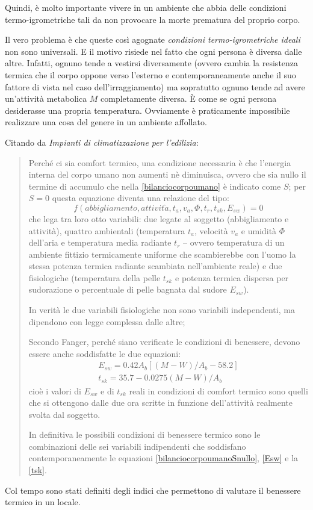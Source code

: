 Quindi, è molto importante vivere in un ambiente che abbia delle condizioni termo-igrometriche tali da non provocare la morte prematura del proprio corpo.

Il vero problema è che queste così agognate \emph{condizioni termo-igrometriche ideali} non sono universali. E il motivo risiede nel fatto che ogni persona è diversa dalle altre. Infatti, ognuno tende a vestirsi diversamente (ovvero cambia la resistenza termica che il corpo oppone verso l'esterno e contemporaneamente anche il suo fattore di vista nel caso dell'irraggiamento) ma sopratutto ognuno tende ad avere un'attività metabolica $M$ completamente diversa. È come se ogni persona desiderasse una propria temperatura. Ovviamente è praticamente impossibile realizzare una cosa del genere in un ambiente affollato.

Citando da \emph{Impianti di climatizzazione per l'edilizia}:
\begin{quote}
	Perché ci sia comfort termico, una condizione necessaria è che l'energia interna del corpo umano non aumenti nè diminuisca, ovvero che sia nullo il termine di accumulo che nella \ref{bilanciocorpoumano} è indicato come $S$; per $S=0$ questa equazione diventa una relazione del tipo:
	\begin{equation}
	\label{bilanciocorpoumanoSnullo}
		f(abbigliamento, attivit\grave{a}, t_a, v_a, \Phi, t_r, t_{sk}, E_{sw})=0
	\end{equation}
	che lega tra loro otto variabili: due legate al soggetto (abbigliamento e attività), quattro ambientali (temperatura $t_a$, velocità $v_a$ e umidità $\Phi$ dell'aria e temperatura media radiante $t_r$ -- ovvero temperatura di un ambiente fittizio termicamente uniforme che scambierebbe con l'uomo la stessa potenza termica radiante scambiata nell'ambiente reale) e due fisiologiche (temperatura della pelle $t_{sk}$ e potenza termica dispersa per sudorazione o percentuale di pelle bagnata dal sudore $E_{sw}$).
	
	In verità le due variabili fisiologiche non sono variabili independenti, ma dipendono con legge complessa dalle altre; 
	
	\sdots
	
	Secondo Fanger, perché siano verificate le condizioni di benessere, devono essere anche soddisfatte le due equazioni:
	\begin{gather}
	\label{Esw}
		E_{sw}=0.42A_b[(M-W)/A_b-58.2]\\
	\label{tsk}
		t_{sk}=35.7-0.0275(M-W)/A_b
	\end{gather}
	cioè i valori di $E_{sw}$ e di $t_{sk}$ reali in condizioni di comfort termico sono quelli che si ottengono dalle due ora scritte in funzione dell'attività realmente svolta dal soggetto.
	
	In definitiva le possibili condizioni di benessere termico sono le combinazioni delle sei variabili indipendenti che soddisfano contemporaneamente le equazioni \ref{bilanciocorpoumanoSnullo}, \ref{Esw} e la \ref{tsk}.
\end{quote}
Col tempo sono stati definiti degli indici che permettono di valutare il benessere termico in un locale. 

